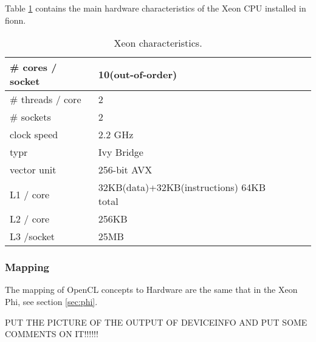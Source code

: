 \par{Table \ref{tab:xeon_arch} contains the main hardware characteristics of the
    Xeon CPU installed in fionn.}

\begin{table}[!h]
    \centering
    \begin{tabular}{| l | l | l | l |}
    \hline
    \# cores / socket& 10(out-of-order) \\ \hline
    \# threads / core& 2 \\ \hline
    \# sockets & 2 \\ \hline
    clock speed & 2.2 GHz \\ \hline
    typr & Ivy Bridge \\ \hline
    vector unit & 256-bit AVX \\ \hline
    L1 / core & 32KB(data)+32KB(instructions) 64KB total \\ \hline
    L2 / core & 256KB \\ \hline
    L3 /socket & 25MB \\ \hline
    \end{tabular}
    \caption{Xeon characteristics\cite{xeon_specs}.}
    \label{tab:xeon_arch}
\end{table}

\subsubsection{Mapping}

\par{The mapping of OpenCL concepts to Hardware are the same that in the Xeon 
    Phi, see section \ref{sec:phi}.}

\par{{\color{red} PUT THE PICTURE OF THE OUTPUT OF DEVICEINFO AND PUT SOME 
    COMMENTS ON IT!!!!!!}}
